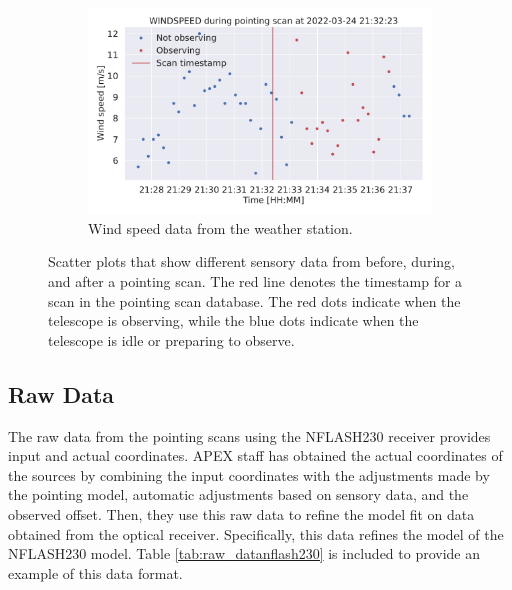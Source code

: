 \begin{figure}[H]
\begin{subfigure}[t]{0.49\textwidth}
        \centering
        \includegraphics[width=\textwidth]{Feature during scans/scan_WINDSPEED_335.pdf}
        \caption{Wind speed data from the weather station.}
        \label{subfig:scan_windspeed}
    \end{subfigure}
     \caption[Features during pointing scans]{Scatter plots that show different sensory data from before, during, and after a pointing scan. The red line denotes the timestamp for a scan in the pointing scan database.
     The red dots indicate when the telescope is observing, while the blue dots indicate when the telescope is idle or preparing to observe.}
     \label{fig:features_during_scans}
\end{figure}




\subsection{Raw Data}
The raw data from the pointing scans using the NFLASH230 receiver provides input and actual coordinates.
APEX staff has obtained the actual coordinates of the sources by combining the input coordinates with the adjustments made by the pointing model,
automatic adjustments based on sensory data, and the observed offset.
Then, they use this raw data to refine the model fit on data obtained from the optical receiver.
Specifically, this data refines the model of the NFLASH230 model.
Table \ref{tab:raw_datanflash230} is included to provide an example of this data format. 



